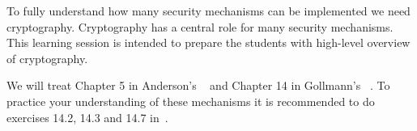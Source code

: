 To fully understand how many security mechanisms can be implemented we need 
cryptography.
Cryptography has a central role for many security mechanisms.
This learning session is intended to prepare the students with high-level 
overview of cryptography.

We will treat
Chapter 5 in Anderson's ~\cite{Anderson2008sea} and
Chapter 14 in Gollmann's ~\cite{Gollmann2011cs}.
To practice your understanding of these mechanisms it is recommended to do 
exercises 14.2, 14.3 and 14.7 in~\cite{Gollmann2011cs}.
